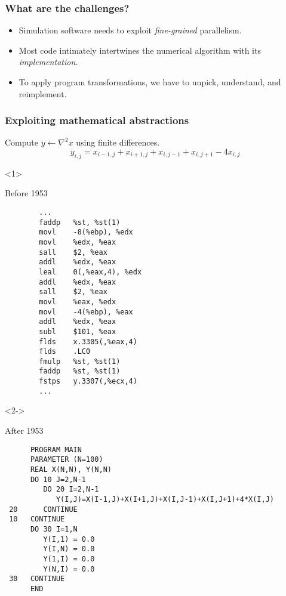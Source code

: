 \documentclass[presentation]{beamer}
\begin{document}
\begin{frame}
  \frametitle{What are the challenges?}
  \begin{itemize}
  \item Simulation software needs to exploit \emph{fine-grained}
    parallelism.
  \item Most code intimately intertwines the numerical algorithm with
    its \emph{implementation}.
  \item To apply program transformations, we have to unpick,
    understand, and reimplement.
  \end{itemize}
\end{frame}

\begin{frame}[fragile]
  \frametitle{Exploiting mathematical abstractions}
  Compute $y \leftarrow \nabla^2 x$ using finite differences.
  \begin{equation*}
    y_{i,j} = x_{i-1, j} + x_{i+1, j} + x_{i, j-1} + x_{i, j+1} - 4x_{i,j}    
  \end{equation*}
  \begin{overlayarea}{\textwidth}{0.8\textheight}
  \begin{onlyenv}<1>
    \begin{block}{Before 1953}
\begin{verbatim}
        ...
        faddp   %st, %st(1)
        movl    -8(%ebp), %edx
        movl    %edx, %eax
        sall    $2, %eax
        addl    %edx, %eax
        leal    0(,%eax,4), %edx
        addl    %edx, %eax
        sall    $2, %eax
        movl    %eax, %edx
        movl    -4(%ebp), %eax
        addl    %edx, %eax
        subl    $101, %eax
        flds    x.3305(,%eax,4)
        flds    .LC0
        fmulp   %st, %st(1)
        faddp   %st, %st(1)
        fstps   y.3307(,%ecx,4)
        ...
\end{verbatim}
    \end{block}
  \end{onlyenv}
  \begin{onlyenv}<2->
    \begin{block}{After 1953}
\begin{verbatim}
      PROGRAM MAIN
      PARAMETER (N=100)
      REAL X(N,N), Y(N,N)
      DO 10 J=2,N-1
         DO 20 I=2,N-1
            Y(I,J)=X(I-1,J)+X(I+1,J)+X(I,J-1)+X(I,J+1)+4*X(I,J)
 20      CONTINUE
 10   CONTINUE
      DO 30 I=1,N
         Y(I,1) = 0.0
         Y(I,N) = 0.0
         Y(1,I) = 0.0
         Y(N,I) = 0.0
 30   CONTINUE
      END
\end{verbatim}
    \end{block}
  \end{onlyenv}
  \end{overlayarea}
\end{frame}
\end{document}
